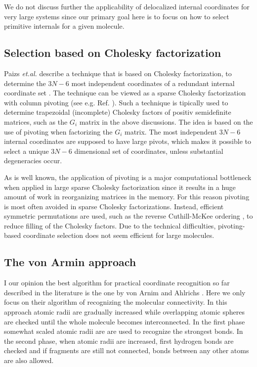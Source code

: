 \documentclass[prl,aps,preprint,superbib,12pt]{revtex4}
\begin{document}
We do not discuss further the applicability of delocalized internal 
coordinates for very large systems since our primary goal here is 
to focus on how to select primitive internals for a given molecule.

\subsection{Selection based on Cholesky factorization}
Paizs {\it et.al.} describe a technique that is based
on Cholesky factorization, to determine the $3N-6$ most independent
coordinates of a redundant internal coordinate set \cite{BPaizs00}.
The technique can be viewed as a sparse Cholesky factorization
with column pivoting (see e.g. Ref. ). 
Such a technique
is tipically used to determine trapezoidal (incomplete) Cholesky
factors of positiv semidefinite matrices, such as the $G_{i}$ matrix
in the above discussions. The idea is based on the use of
pivoting when factorizing the $G_{i}$ matrix. The most independent
$3N-6$ internal coordinates are supposed to have large pivots, 
which makes it possible to select a unique $3N-6$ dimensional
set of coordinates, unless substantial degeneracies occur.

As is well known, the application of pivoting
is a major computational bottleneck when applied in large sparse 
Cholesky factorization \cite{AGeorge81} 
since it results in a huge amount of work
in reorganizing matrices in the memory. For this reason pivoting is 
most often avoided in sparse Cholesky factorizations. Instead,
efficient symmetric permutations are used, such as the
reverse Cuthill-McKee ordering \cite{AGeorge81}, to reduce filling
of the Cholesky factors. Due to the technical difficulties,
pivoting-based coordinate selection does not seem efficient for large 
molecules.

\subsection{The von Armin approach}
I our opinion the best algorithm for practical 
coordinate recognition so far described
in the literature is the one by von Arnim and Ahlrichs 
\cite{MvonArnim99}. Here we only focus on their algorithm of 
recognizing the molecular connectivity. In this approach
atomic radii are gradually increased while overlapping atomic 
spheres are checked until the whole molecule becomes interconnected.   
In the first phase somewhat scaled atomic radii are are used
to recognize the strongest bonds. In the second phase, when 
atomic radii are increased, first hydrogen bonds are checked and 
if fragments are still not connected, bonds between any other atoms
are also allowed. 
\end{document}
